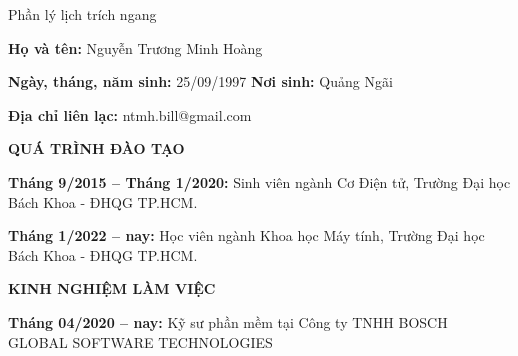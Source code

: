 \newpage
\thispagestyle{empty}

\begin{preface}{Phần lý lịch trích ngang}

\vspace{0.45cm}

\noindent
\textbf{Họ và tên:} Nguyễn Trương Minh Hoàng

\vspace{0.18cm}

\noindent
\textbf{Ngày, tháng, năm sinh:} 25/09/1997 \hfill \textbf{Nơi sinh:} Quảng Ngãi

\vspace{0.18cm}

\noindent
\textbf{Địa chỉ liên lạc:} ntmh.bill@gmail.com

\vspace{0.5cm}

\noindent
{\large \textbf{QUÁ TRÌNH ĐÀO TẠO}}

\vspace{0.25cm}

\noindent
\textbf{Tháng 9/2015 -- Tháng 1/2020:} Sinh viên ngành Cơ Điện tử, Trường Đại học Bách Khoa - ĐHQG TP.HCM.

\vspace{0.22cm}

\noindent
\textbf{Tháng 1/2022 -- nay:} Học viên ngành Khoa học Máy tính, Trường Đại học Bách Khoa - ĐHQG TP.HCM.

\vspace{0.5cm}

\noindent
{\large \textbf{KINH NGHIỆM LÀM VIỆC}}

\vspace{0.25cm}

\noindent
\textbf{Tháng 04/2020 -- nay:} Kỹ sư phần mềm tại Công ty TNHH BOSCH GLOBAL SOFTWARE TECHNOLOGIES

\end{preface}
